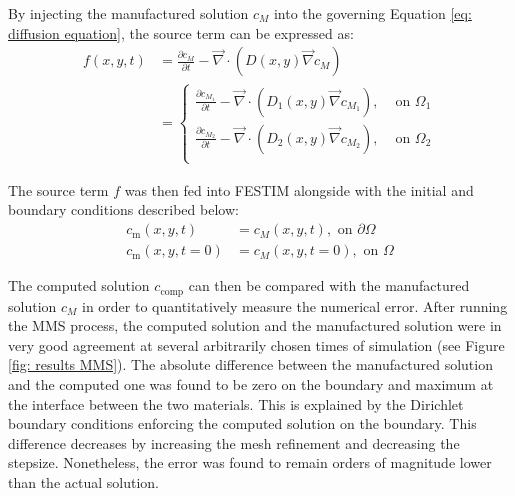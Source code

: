 By injecting the manufactured solution $c_M$ into the governing Equation \ref{eq: diffusion equation}, the source term can be expressed as:
\begin{align}
    f(x, y, t) &= \frac{\partial c_M}{\partial t} - \vec{\nabla} \cdot\left(D(x, y)
    \vec{\nabla}c_M\right) \nonumber \\
    &= \begin{cases}
        \frac{\partial c_{M_1}}{\partial t} - \vec{\nabla} \cdot\left(D_1(x, y)
    \vec{\nabla}c_{M_1}\right),& \text{ on } \Omega_1\\
    \frac{\partial c_{M_2}}{\partial t} - \vec{\nabla} \cdot\left(D_2(x, y)
    \vec{\nabla}c_{M_2}\right),& \text{ on } \Omega_2\\
    \end{cases}
\end{align}

The source term $f$ was then fed into FESTIM alongside with the initial and boundary conditions described below:
\begin{subequations}
    \begin{align}
        c_\mathrm{m}(x, y, t) &= c_M(x, y, t), \text{ on } \partial \Omega \\
        c_\mathrm{m}(x, y, t=0) &= c_M(x, y, t=0), \text{ on } \Omega
    \end{align}
\end{subequations}

The computed solution $c_\mathrm{comp}$ can then be compared with the manufactured solution $c_M$ in order to quantitatively measure the numerical error.
After running the MMS process, the computed solution and the manufactured solution were in very good agreement at several arbitrarily chosen times of simulation (see Figure \ref{fig: results MMS}).
The absolute difference between the manufactured solution and the computed one was found to be zero on the boundary and maximum at the interface between the two materials.
This is explained by the Dirichlet boundary conditions enforcing the computed solution on the boundary.
This difference decreases by increasing the mesh refinement and decreasing the stepsize.
Nonetheless, the error was found to remain orders of magnitude lower than the actual solution.

